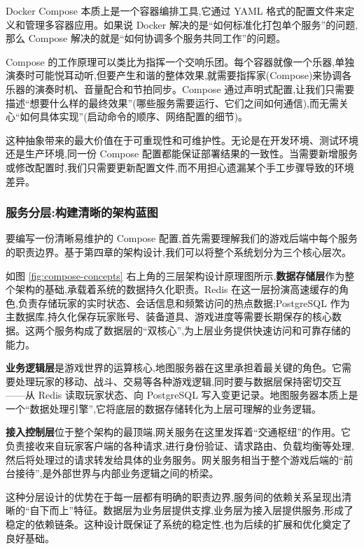 Docker Compose 本质上是一个容器编排工具,它通过 YAML 格式的配置文件来定义和管理多容器应用。如果说 Docker 解决的是``如何标准化打包单个服务''的问题,那么 Compose 解决的就是``如何协调多个服务共同工作''的问题。

Compose 的工作原理可以类比为指挥一个交响乐团。每个容器就像一个乐器,单独演奏时可能悦耳动听,但要产生和谐的整体效果,就需要指挥家(Compose)来协调各乐器的演奏时机、音量配合和节拍同步。Compose 通过声明式配置,让我们只需要描述``想要什么样的最终效果''(哪些服务需要运行、它们之间如何通信),而无需关心``如何具体实现''(启动命令的顺序、网络配置的细节)。

这种抽象带来的最大价值在于可重现性和可维护性。无论是在开发环境、测试环境还是生产环境,同一份 Compose 配置都能保证部署结果的一致性。当需要新增服务或修改配置时,我们只需要更新配置文件,而不用担心遗漏某个手工步骤导致的环境差异。

\subsubsection{服务分层:构建清晰的架构蓝图}

要编写一份清晰易维护的 Compose 配置,首先需要理解我们的游戏后端中每个服务的职责边界。基于第四章的架构设计,我们可以将整个系统划分为三个核心层次。

如图 \ref{fig:compose-concepts} 右上角的三层架构设计原理图所示,\textbf{数据存储层}作为整个架构的基础,承载着系统的数据持久化职责。Redis 在这一层扮演高速缓存的角色,负责存储玩家的实时状态、会话信息和频繁访问的热点数据;PostgreSQL 作为主数据库,持久化保存玩家账号、装备道具、游戏进度等需要长期保存的核心数据。这两个服务构成了数据层的``双核心'',为上层业务提供快速访问和可靠存储的能力。

\textbf{业务逻辑层}是游戏世界的运算核心,地图服务器在这里承担着最关键的角色。它需要处理玩家的移动、战斗、交易等各种游戏逻辑,同时要与数据层保持密切交互——从 Redis 读取玩家状态、向 PostgreSQL 写入变更记录。地图服务器本质上是一个``数据处理引擎'',它将底层的数据存储转化为上层可理解的业务逻辑。

\textbf{接入控制层}位于整个架构的最顶端,网关服务在这里发挥着``交通枢纽''的作用。它负责接收来自玩家客户端的各种请求,进行身份验证、请求路由、负载均衡等处理,然后将处理过的请求转发给具体的业务服务。网关服务相当于整个游戏后端的``前台接待'',是外部世界与内部业务逻辑之间的桥梁。

这种分层设计的优势在于每一层都有明确的职责边界,服务间的依赖关系呈现出清晰的``自下而上''特征。数据层为业务层提供支撑,业务层为接入层提供服务,形成了稳定的依赖链条。这种设计既保证了系统的稳定性,也为后续的扩展和优化奠定了良好基础。

